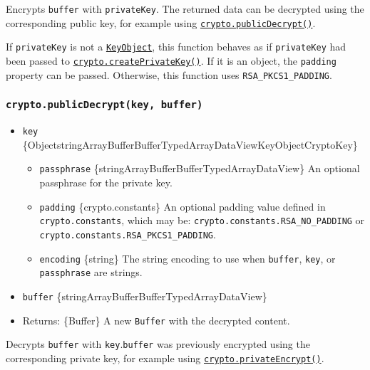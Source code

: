 Encrypts \texttt{buffer} with \texttt{privateKey}. The returned data can
be decrypted using the corresponding public key, for example using
\hyperref[cryptopublicdecryptkey-buffer]{\texttt{crypto.publicDecrypt()}}.

If \texttt{privateKey} is not a
\hyperref[class-keyobject]{\texttt{KeyObject}}, this function behaves as
if \texttt{privateKey} had been passed to
\hyperref[cryptocreateprivatekeykey]{\texttt{crypto.createPrivateKey()}}.
If it is an object, the \texttt{padding} property can be passed.
Otherwise, this function uses \texttt{RSA\_PKCS1\_PADDING}.

\subsubsection{\texorpdfstring{\texttt{crypto.publicDecrypt(key,\ buffer)}}{crypto.publicDecrypt(key, buffer)}}\label{crypto.publicdecryptkey-buffer}

\begin{itemize}
\tightlist
\item
  \texttt{key}
  \{Object\textbar string\textbar ArrayBuffer\textbar Buffer\textbar TypedArray\textbar DataView\textbar KeyObject\textbar CryptoKey\}

  \begin{itemize}
  \tightlist
  \item
    \texttt{passphrase}
    \{string\textbar ArrayBuffer\textbar Buffer\textbar TypedArray\textbar DataView\}
    An optional passphrase for the private key.
  \item
    \texttt{padding} \{crypto.constants\} An optional padding value
    defined in \texttt{crypto.constants}, which may be:
    \texttt{crypto.constants.RSA\_NO\_PADDING} or
    \texttt{crypto.constants.RSA\_PKCS1\_PADDING}.
  \item
    \texttt{encoding} \{string\} The string encoding to use when
    \texttt{buffer}, \texttt{key}, or \texttt{passphrase} are strings.
  \end{itemize}
\item
  \texttt{buffer}
  \{string\textbar ArrayBuffer\textbar Buffer\textbar TypedArray\textbar DataView\}
\item
  Returns: \{Buffer\} A new \texttt{Buffer} with the decrypted content.
\end{itemize}

Decrypts \texttt{buffer} with \texttt{key}.\texttt{buffer} was
previously encrypted using the corresponding private key, for example
using
\hyperref[cryptoprivateencryptprivatekey-buffer]{\texttt{crypto.privateEncrypt()}}.

